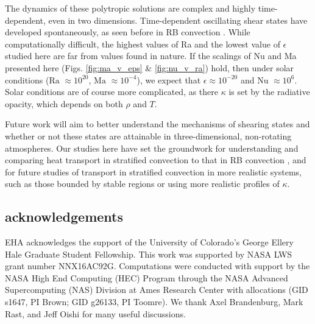 \documentclass[aps, prl, twocolumn, nofootinbib, groupedaddress, amsfonts, amssymb, amsmath]{revtex4-1}
\begin{document}

The dynamics of these polytropic solutions are complex and highly time-dependent, even in two dimensions.
Time-dependent oscillating shear states have developed spontaneously, as seen before in RB convection
\cite{goluskin&all2014}.  While computationally difficult, the highest values of Ra and the lowest value
of $\epsilon$ studied here are far from values found in nature.  If the scalings of Nu and Ma
presented here (Figs. \ref{fig:ma_v_eps} \& \ref{fig:nu_v_ra}) hold, then under solar conditions ($\text{Ra }\approx 10^{20}$, $\text{Ma }\approx 10^{-4}$), we expect that $\epsilon \approx 10^{-20}$ and
$\text{Nu }\approx 10^{6}$.  
Solar conditions are of course more complicated, as there $\kappa$ is
set by the radiative opacity, which depends on both $\rho$ and $T$.

Future work will aim to better understand the mechanisms of shearing states and
whether or not these states are attainable in three-dimensional, non-rotating atmospheres.  Our studies
here have set the groundwork for understanding and comparing heat transport in stratified convection
to that in RB convection \cite{johnston&doering2009}, and for future studies of transport in stratified
convection in more realistic systems, such as those bounded by stable regions \cite{hurlburt&all1986} or 
using more realistic profiles of $\kappa$.



\subsection{acknowledgements}
EHA acknowledges the support of the University of Colorado's George 
Ellery Hale Graduate Student Fellowship.
This work was supported by  NASA LWS grant number NNX16AC92G.  
Computations were conducted 
with support by the NASA High End Computing (HEC) Program through the NASA 
Advanced Supercomputing (NAS) Division at Ames Research Center
with allocations (GID s1647, PI Brown; GID g26133, PI Toomre).
We thank Axel Brandenburg, Mark Rast, and Jeff Oishi for many useful discussions.


\end{document}
